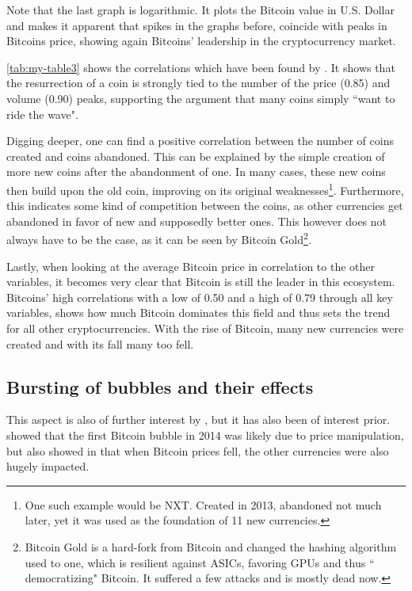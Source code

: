 \documentclass[11pt,a4paper,compsoc,conference]{IEEEtran}
\begin{document}
Note that the last graph is logarithmic. It plots the Bitcoin value in U.S. Dollar and makes it apparent that spikes in the graphs before, coincide with peaks in Bitcoins price, showing again Bitcoins' leadership in the cryptocurrency market.

\autoref{tab:my-table3} shows the correlations which have been found by \citet{Feder2018TheRA}. It shows that the resurrection of a coin is strongly tied to the number of the price (0.85) and volume (0.90) peaks, supporting the argument that many coins simply ``want to ride the wave".  

Digging deeper, one can find a positive correlation between the number of coins created and coins abandoned. This can be explained by the simple creation of more new coins after the abandonment of one. In many cases, these new coins then build upon the old coin, improving on its original weaknesses\footnote{One such example would be NXT. Created in 2013, abandoned not much later, yet it was used as the foundation of 11 new currencies\citep{mapofcoins}. }. Furthermore, this indicates some kind of competition between the coins, as other currencies get abandoned in favor of new and supposedly better ones. This however does not always have to be the case, as it can be seen by Bitcoin Gold\footnote{Bitcoin Gold is a hard-fork from Bitcoin and changed the hashing algorithm used to one, which is resilient against ASICs, favoring GPUs and thus `` democratizing" Bitcoin. It suffered a few attacks and is mostly dead now. }.

Lastly, when looking at the average Bitcoin price in correlation to the other variables, it becomes very clear that Bitcoin is still the leader in this ecosystem. Bitcoins' high correlations with a low of 0.50 and a high of 0.79 through all key variables, shows how much Bitcoin dominates this field and thus sets the trend for all other cryptocurrencies. With the rise of Bitcoin, many new currencies were created and with its fall many too fell. 

\subsection{Bursting of bubbles and their effects}
This aspect is also of further interest by \citet{Feder2018TheRA}, but it has also been of interest prior. \citet{article} showed that the first Bitcoin bubble in 2014 was likely due to price manipulation, but also showed in \citep{predictwinner} that when Bitcoin prices fell, the other currencies were also hugely impacted. 
\end{document}
